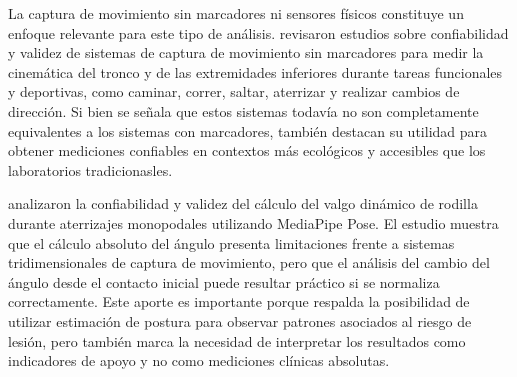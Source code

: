 La captura de movimiento sin marcadores ni sensores físicos constituye un enfoque relevante para
este tipo de análisis. \textcite{YomaEtAl2025} revisaron estudios sobre confiabilidad y validez
de sistemas de captura de movimiento sin marcadores para medir la cinemática del tronco y de
las extremidades inferiores durante tareas funcionales y deportivas, como caminar, correr,
saltar, aterrizar y realizar cambios de dirección. Si bien se señala que estos sistemas todavía
no son completamente equivalentes a los sistemas con marcadores, también destacan su utilidad
para obtener mediciones confiables en contextos más ecológicos y accesibles que los laboratorios
tradicionasles.

\textcite{AsaedaEtAl2024} analizaron la confiabilidad y validez del cálculo del valgo dinámico
de rodilla durante aterrizajes monopodales utilizando MediaPipe Pose. El estudio muestra que el
cálculo absoluto del ángulo presenta limitaciones frente a sistemas tridimensionales de captura
de movimiento, pero que el análisis del cambio del ángulo desde el contacto inicial puede
resultar práctico si se normaliza correctamente. Este aporte es importante porque respalda la
posibilidad de utilizar estimación de postura para observar patrones asociados al riesgo de
lesión, pero también marca la necesidad de interpretar los resultados como indicadores de apoyo
y no como mediciones clínicas absolutas.

